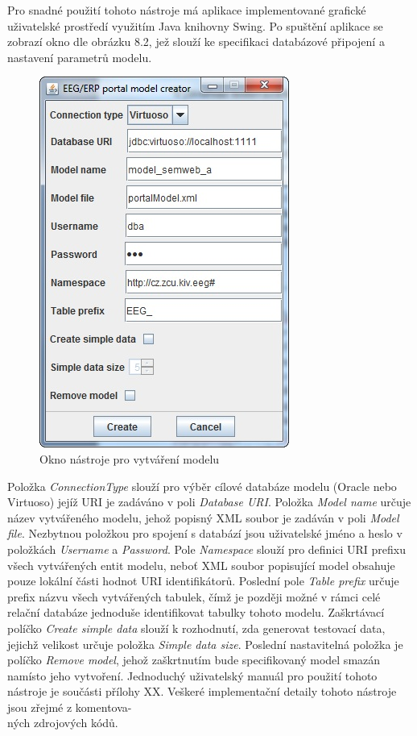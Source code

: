 \documentclass{projekt}
\begin{document}
Pro snadné použití tohoto nástroje má aplikace implementované grafické uživatelské prostředí využitím Java knihovny Swing. Po spuštění aplikace se zobrazí okno dle obrázku 8.2, jež slouží ke specifikaci databázové připojení a nastavení parametrů modelu.


\begin{figure}[htb]
\begin{center}
\includegraphics[scale=0.8]{Creator.jpg}
\caption{Okno nástroje pro vytváření modelu}
\end{center}
\end{figure}

Položka {\it ConnectionType} slouží pro výběr cílové databáze modelu (Oracle nebo Virtuoso) jejíž URI je zadáváno v poli {\it Database URI}. Položka {\it Model name} určuje název vytvářeného modelu, jehož popisný XML soubor je zadáván v poli {\it Model file}. Nezbytnou položkou pro spojení s databází jsou uživatelské jméno a heslo v položkách {\it Username} a {\it Password}. Pole {\it Namespace} slouží pro definici URI prefixu všech vytvářených entit modelu, neboť XML soubor popisující model obsahuje pouze lokální části hodnot URI identifikátorů. Poslední pole {\it Table prefix} určuje prefix názvu všech vytvářených tabulek, čímž je později možné v rámci celé relační databáze jednoduše identifikovat tabulky tohoto modelu. 
Zaškrtávací políčko {\it Create simple data} slouží k rozhodnutí, zda generovat testovací data, jejichž velikost určuje položka {\it Simple data size}. Poslední nastavitelná položka je políčko {\it Remove model}, jehož zaškrtnutím bude specifikovaný model smazán namísto jeho vytvoření.
Jednoduchý uživatelský manuál pro použití tohoto nástroje je součásti přílohy XX. Veškeré implementační detaily tohoto nástroje jsou zřejmé z komentova-\\ných zdrojových kódů.
\end{document}
